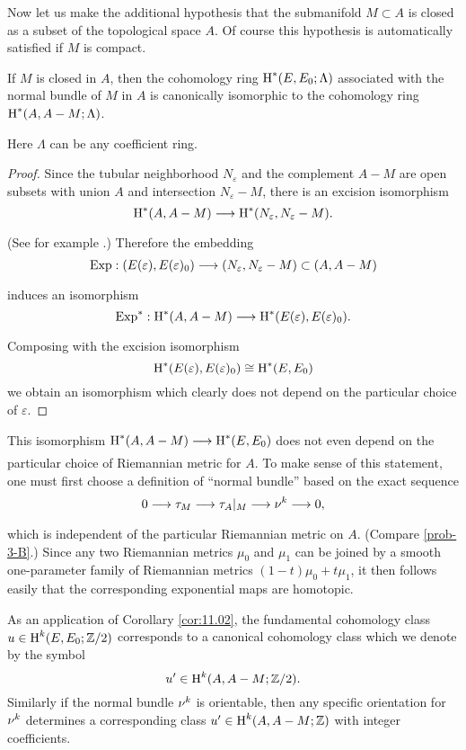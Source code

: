 \documentclass[../main]{subfiles}
\begin{document}
Now let us make the additional hypothesis that the submanifold $M \subset A$ is closed as a subset of the topological space $A$. Of course this hypothesis is automatically satisfied if $M$ is compact.

\begin{corollary} \label{cor:11.02}
If $M$ is closed in $A$, then the cohomology ring $\operatorname{H}^{*}(E, E_{0} ; \Lambda)$ associated with the normal bundle of $M$ in $A$ is canonically isomorphic to the cohomology ring $\operatorname{H}^{*}(A, A-M ; \Lambda)$.
\end{corollary}

Here $\Lambda$ can be any coefficient ring.

\begin{proof} Since the tubular neighborhood $N_{\varepsilon}$ and the complement $A-M$ are open subsets with union $A$ and intersection $N_{\varepsilon}-M$, there is an excision isomorphism
\[
\homology^{*}(A, A-M) \varrightarrow{} \homology^{*}(N_{\varepsilon}, N_{\varepsilon}-M).
\]
(See for example \cite{spanier1981}.) Therefore the embedding
\[
\Exp:(\total(\varepsilon), \total(\varepsilon)_{0}) \varrightarrow{} (N_{\varepsilon}, N_{\varepsilon}-M) \subset(A, A-M)
\]
induces an isomorphism
\[
\Exp^{*}: \homology^{*}(A, A-M) \varrightarrow{} \homology^{*}(\total(\varepsilon), \total(\varepsilon)_{0}) .
\]
Composing with the excision isomorphism
\[
\operatorname{H}^{*}(E(\varepsilon), E(\varepsilon)_{0}) \cong \operatorname{H}^{*}(E, E_{0})
\]
we obtain an isomorphism which clearly does not depend on the particular choice of $\varepsilon$.
\end{proof}

\begin{remark*} This isomorphism $\homology^{*}(A, A-M) \varrightarrow{} \homology^{*}(E, E_{0})$ does not even depend on the particular choice of Riemannian metric for $A$. To make sense of this statement, one must first choose a definition of ``normal bundle'' based on the exact sequence
\[
0 \varrightarrow{} \tangentbundle{M} \varrightarrow{} \tangentbundle{A}|_M \varrightarrow{} \normalbundle{}^k \varrightarrow{} 0,
\]
which is independent of the particular Riemannian metric on $A$. (Compare \ref{prob-3-B}.) Since any two Riemannian metrics $\mu_{0}$ and $\mu_{1}$ can be joined by a smooth one-parameter family of Riemannian metrics $(1-t) \mu_{0}+t \mu_{1}$, it then follows easily that the corresponding exponential maps are homotopic.
\end{remark*}
As an application of Corollary \ref{cor:11.02}, the fundamental cohomology class \newline $u \in \operatorname{H}^{k}(E, E_{0} ; \mathbb{Z} / 2)$ corresponds to a canonical cohomology class which we denote by the symbol
\[
u' \in \operatorname{H}^{k}(A, A-M ; \mathbb{Z}/ 2) .
\]
Similarly if the normal bundle $\nu_{}^{k}$ is orientable, then any specific orientation for $\nu_{}^{k}$ determines a corresponding class $u' \in \operatorname{H}^{k}(A, A-M ; \mathbb{Z})$ with integer coefficients.
\end{document}
